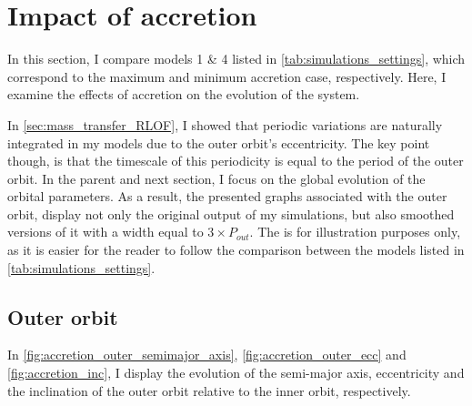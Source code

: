 \section{Impact of accretion}\label{sec:accretion}

In this section, I compare models  1 \& 4 listed in \cref{tab:simulations_settings}, which correspond to the maximum and minimum accretion case, respectively. Here, I examine the effects of accretion on the evolution of the system.

In \cref{sec:mass_transfer_RLOF}, I showed that periodic variations are naturally integrated in my models due to the outer orbit's eccentricity. The key point though, is that the timescale of this periodicity is equal to the period of the outer orbit. In the parent and next section, I focus on the global evolution of the orbital parameters. As a result, the presented graphs associated with the outer orbit, display not only the original output of my simulations, but also smoothed versions of it with a width equal to $3 \times P_{out}$. The is for illustration purposes only, as it is easier for the reader to follow the comparison between the models listed in \cref{tab:simulations_settings}. 

\subsection{Outer orbit}

In \cref{fig:accretion_outer_semimajor_axis}, \cref{fig:accretion_outer_ecc} and \cref{fig:accretion_inc}, I display the evolution of the semi-major axis, eccentricity and the inclination of the outer orbit relative to the inner orbit, respectively.

